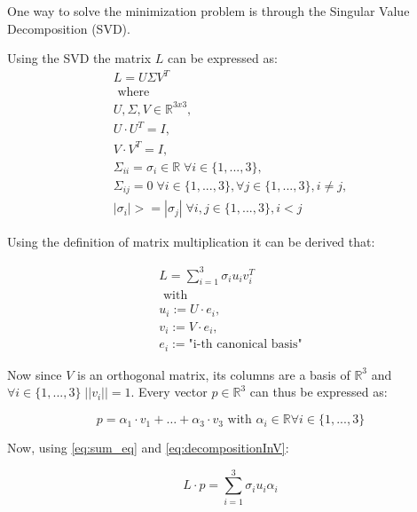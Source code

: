 One way to solve the minimization problem is through the Singular Value Decomposition (SVD).

Using the SVD the matrix $L$ can be expressed as:
\begin{equation}
    \begin{matrix}
        L = U \Sigma V^T \\
        \text{ where } \\
        U, \Sigma, V \in \mathbb{R}^{3x3}, \\
        U\cdot U^T = I, \\
        V\cdot V^T = I,\\
        \Sigma_{ii} = \sigma_i \in \mathbb{R} \; \forall i \in \{1, ..., 3\}, \\
         \Sigma_{ij} = 0 \; \forall i \in \{1, ..., 3\}, \forall j \in \{1, ..., 3\}, i\neq j, \\
         |\sigma_i| >= |\sigma_j| \; \forall i, j \in \{1, ..., 3\}, i<j
    \end{matrix}
\end{equation}

Using the definition of matrix multiplication it can be derived that:

\begin{equation} \label{eq:sum_eq}
    \begin{matrix}
        L = \sum_{i = 1}^3{\sigma_i u_i v_i^T}\\
        \text{ with }\\
        u_i := U \cdot e_i, \\
        v_i := V\cdot e_i, \\
        e_i := \text{"i-th canonical basis"}
    \end{matrix}
\end{equation}


Now since $V$ is an orthogonal matrix, its columns are a basis of $\mathbb{R}^3$ and $\forall i \in \{1, ..., 3\}\; ||v_i|| = 1$. Every vector $p \in \mathbb{R}^3$ can thus be expressed as:

\begin{equation} \label{eq:decompositionInV}
    p = \alpha_1 \cdot v_1 + \dots + \alpha_3 \cdot v_3 \text{ with } \alpha_i \in \mathbb{R} \forall i \in \{1, ..., 3\}
\end{equation}

Now, using \ref{eq:sum_eq} and \ref{eq:decompositionInV}:

\begin{equation}
    L \cdot p = \sum_{i = 1}^3{\sigma_i u_i \alpha_i}
\end{equation}


